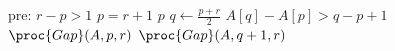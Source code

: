 \begin{codebox}
\zi \Comment pre: $r - p > 1$
\li \If $p = r + 1$
\li     \Then \Return $p$
\li     \Else
\li         $q \gets \frac{p+r}{2}$
\li     \If $A[q] - A[p] > q - p + 1$
\li         \Then
                $\proc{Gap}(A,p,r)$
\li         \Else
\li             $\proc{Gap}(A,q+1,r)$
        \End
    \End
\end{codebox}